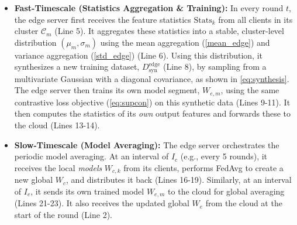 \begin{itemize}
    \item \textbf{Fast-Timescale (Statistics Aggregation \& Training):} In every round $t$, the edge server first receives the feature statistics $\text{Stats}_k$ from all clients in its cluster $\mathcal{C}_m$ (Line 5). It aggregates these statistics into a stable, cluster-level distribution $(\mu_m, \sigma_m)$ using the mean aggregation (\cref{mean_edge}) and variance aggregation (\cref{std_edge}) (Line 6). Using this distribution, it synthesizes a new training dataset, $D_{\text{syn}}^{\text{edge}}$ (Line 8), by sampling from a multivariate Gaussian with a diagonal covariance, as shown in \cref{eq:synthesis}. The edge server then trains its own model segment, $W_{e,m}$, using the same contrastive loss objective (\cref{eq:supcon}) on this synthetic data (Lines 9-11). It then computes the statistics of its \textit{own} output features and forwards these to the cloud (Lines 13-14).

    \item \textbf{Slow-Timescale (Model Averaging):} The edge server orchestrates the periodic model averaging. At an interval of $I_c$ (e.g., every 5 rounds), it receives the local \textit{models} $W_{c,k}$ from its clients, performs FedAvg to create a new global $W_c$, and distributes it back (Lines 16-19). Similarly, at an interval of $I_e$, it sends its own trained model $W_{e,m}$ to the cloud for global averaging (Lines 21-23). It also receives the updated global $W_e$ from the cloud at the start of the round (Line 2).
\end{itemize}


